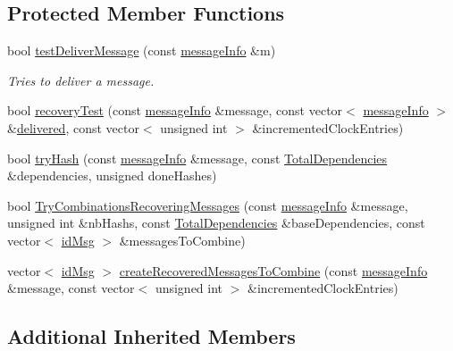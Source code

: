 \subsection*{Protected Member Functions}
\begin{DoxyCompactItemize}
\item 
bool \hyperlink{class_node_with_recovery_test_af9b78d0ed4fefb97e2f54c9279aa4655}{test\+Deliver\+Message} (const \hyperlink{structures_8h_a7e7bdc1d2fff8a9436f2f352b2711ed6}{message\+Info} \&m)
\begin{DoxyCompactList}\small\item\em Tries to deliver a message. \end{DoxyCompactList}\item 
bool \hyperlink{class_node_with_recovery_test_a8e4f79eeb8c415ceca21b82f22eb9038}{recovery\+Test} (const \hyperlink{structures_8h_a7e7bdc1d2fff8a9436f2f352b2711ed6}{message\+Info} \&message, const vector$<$ \hyperlink{structures_8h_a7e7bdc1d2fff8a9436f2f352b2711ed6}{message\+Info} $>$ \&\hyperlink{class_node_with_control_aed34cc5a5b277c43f10f8cbbbeb59327}{delivered}, const vector$<$ unsigned int $>$ \&incremented\+Clock\+Entries)
\item 
bool \hyperlink{class_node_with_recovery_test_a5417b50e5d5e272c8ef70ff962c0ea86}{try\+Hash} (const \hyperlink{structures_8h_a7e7bdc1d2fff8a9436f2f352b2711ed6}{message\+Info} \&message, const \hyperlink{class_total_dependencies}{Total\+Dependencies} \&dependencies, unsigned done\+Hashes)
\item 
bool \hyperlink{class_node_with_recovery_test_ae1d2089be117daef7b2ee4dfd6b92e7d}{Try\+Combinations\+Recovering\+Messages} (const \hyperlink{structures_8h_a7e7bdc1d2fff8a9436f2f352b2711ed6}{message\+Info} \&message, unsigned int \&nb\+Hashs, const \hyperlink{class_total_dependencies}{Total\+Dependencies} \&base\+Dependencies, const vector$<$ \hyperlink{structures_8h_a83a1d9a070efa5341da84cfd8e28d3e5}{id\+Msg} $>$ \&messages\+To\+Combine)
\item 
vector$<$ \hyperlink{structures_8h_a83a1d9a070efa5341da84cfd8e28d3e5}{id\+Msg} $>$ \hyperlink{class_node_with_recovery_test_aa6b94e1bff36f3ec804d4ba136de96b8}{create\+Recovered\+Messages\+To\+Combine} (const \hyperlink{structures_8h_a7e7bdc1d2fff8a9436f2f352b2711ed6}{message\+Info} \&message, const vector$<$ unsigned int $>$ \&incremented\+Clock\+Entries)
\end{DoxyCompactItemize}
\subsection*{Additional Inherited Members}


